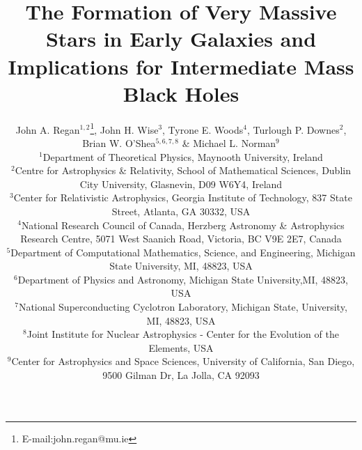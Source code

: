 \documentclass[graphics, twocolumn, usenatbib]{mn2e}
\begin{document}
\title{The Formation of Very Massive Stars in Early Galaxies and Implications for Intermediate Mass Black Holes}
\author[J. A. Regan, J. H. Wise,  T. E. Woods, T.P. Downes, B.W. O'Shea \&  M.L. Norman]{John A. Regan$^{1,2}$\thanks{E-mail:john.regan@mu.ie},
  John H. Wise$^{3}$, Tyrone E. Woods$^{4}$, Turlough P. Downes$^{2}$, \newauthor Brian W. O'Shea$^{5,6,7,8}$ \& Michael L. Norman$^9$\\
  $^1$Department of Theoretical Physics, Maynooth University, Ireland\\
  $^2$Centre for Astrophysics \& Relativity, School of Mathematical Sciences, Dublin City University, Glasnevin, D09 W6Y4, Ireland\\
  $^3$Center for Relativistic Astrophysics, Georgia Institute of Technology, 837 State Street, Atlanta, GA 30332, USA\\
  $^4$National Research Council of Canada, Herzberg Astronomy \& Astrophysics Research Centre, 5071 West Saanich Road, Victoria, BC V9E 2E7, Canada\\
  $^5$Department of Computational Mathematics, Science, and Engineering, Michigan State University, MI, 48823, USA\\    
  $^6$Department of Physics and Astronomy, Michigan State University,MI, 48823, USA\\
  $^7$National Superconducting Cyclotron Laboratory, Michigan State, University, MI, 48823, USA\\
  $^8$Joint Institute for Nuclear Astrophysics - Center for the Evolution of the Elements, USA\\
  $^9$Center for Astrophysics and Space Sciences, University of California, San Diego, 9500 Gilman Dr, La Jolla, CA 92093\\}

\label{firstpage}
\pagerange{\pageref{firstpage}--\pageref{lastpage}}
\maketitle
\end{document}
